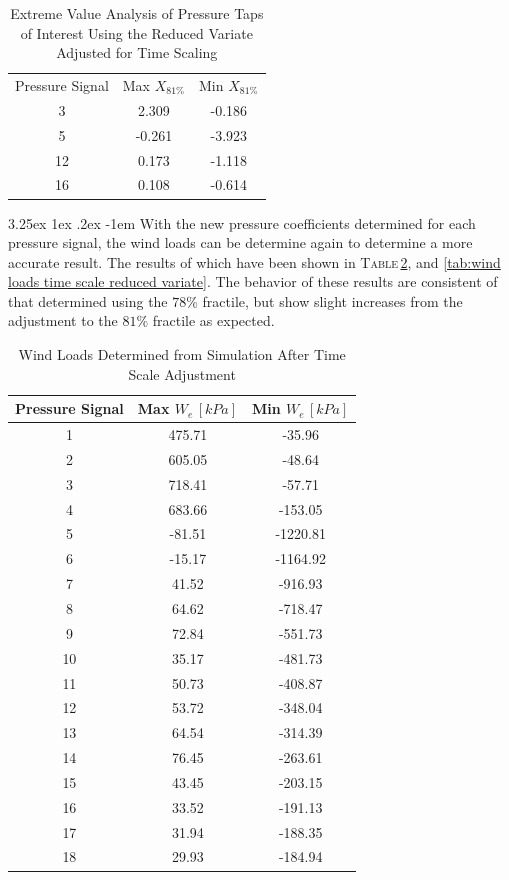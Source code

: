 \documentclass[11pt,a4paper,titlepage]{report}
\makeatletter
\renewcommand\paragraph{\@startsection{paragraph}{5}{\z@}%
  {3.25ex \@plus1ex \@minus.2ex}%
  {-1em}%
  {\normalfont\normalsize\bfseries}}
\makeatother
\begin{document}
\begin{table}[h]
    \centering
    \begin{tabular}{c|c|c}
      Pressure Signal & Max $X_{81\%}$ & Min $X_{81\%}$ \\
3  & 2.309  & -0.186 \\
5  & -0.261 & -3.923 \\
12 & 0.173  & -1.118 \\
16 & 0.108  & -0.614
    \end{tabular}
    \caption{Extreme Value Analysis of Pressure Taps of Interest Using the Reduced Variate Adjusted for Time Scaling}
    \label{tab:extreme time scale}
\end{table}
\paragraph{}With the new pressure coefficients determined for each pressure signal, the wind loads can be determine again to determine a more accurate result. The results of which have been shown in \textsc{Table}\,\ref{tab:wind load time scale}, and \ref{tab:wind loads time scale reduced variate}. The behavior of these results are consistent of that determined using the $78\%$ fractile, but show slight increases from the adjustment to the $81\%$ fractile as expected. 
\begin{table}[h]
    \centering
    \begin{tabular}{c|c|c}
       Pressure Signal & Max $W_e\,[kPa]$ & Min $W_e\,[kPa]$ \\
       \hline
        1  & 475.71 & -35.96   \\
2  & 605.05 & -48.64   \\
3  & 718.41 & -57.71   \\
4  & 683.66 & -153.05  \\
5  & -81.51 & -1220.81 \\
6  & -15.17 & -1164.92 \\
7  & 41.52  & -916.93  \\
8  & 64.62  & -718.47  \\
9  & 72.84  & -551.73  \\
10 & 35.17  & -481.73  \\
11 & 50.73  & -408.87  \\
12 & 53.72  & -348.04  \\
13 & 64.54  & -314.39  \\
14 & 76.45  & -263.61  \\
15 & 43.45  & -203.15  \\
16 & 33.52  & -191.13  \\
17 & 31.94  & -188.35  \\
18 & 29.93  & -184.94 
    \end{tabular}
    \caption{Wind Loads Determined from Simulation After Time Scale Adjustment}
    \label{tab:wind load time scale}
\end{table}
\end{document}
